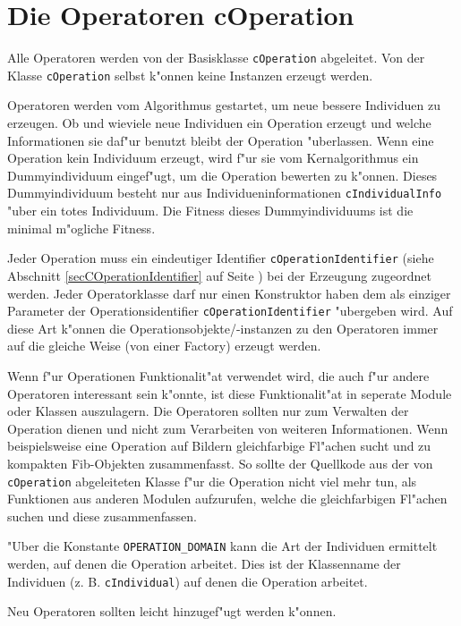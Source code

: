 \section{Die Operatoren cOperation}
\label{secOperations}

Alle Operatoren werden von der Basisklasse \verb|cOperation| abgeleitet. Von der Klasse \verb|cOperation| selbst k"onnen keine Instanzen erzeugt werden.

Operatoren werden vom Algorithmus gestartet, um neue bessere Individuen zu erzeugen. Ob und wieviele neue Individuen ein Operation erzeugt und welche Informationen sie daf"ur benutzt bleibt der Operation "uberlassen.
Wenn eine Operation kein Individuum erzeugt, wird f"ur sie vom Kernalgorithmus ein Dummyindividuum eingef"ugt, um die Operation bewerten zu k"onnen. Dieses Dummyindividuum besteht nur aus Individueninformationen \verb|cIndividualInfo| "uber ein totes Individuum. Die Fitness dieses Dummyindividuums ist die minimal m"ogliche Fitness.

Jeder Operation muss ein eindeutiger Identifier \verb|cOperationIdentifier| (siehe Abschnitt \ref{secCOperationIdentifier} auf Seite \pageref{secCOperationIdentifier}) bei der Erzeugung zugeordnet werden. Jeder Operatorklasse darf nur einen Konstruktor haben dem als einziger Parameter der Operationsidentifier \verb|cOperationIdentifier| "ubergeben wird. Auf diese Art k"onnen die Operationsobjekte/-instanzen zu den Operatoren immer auf die gleiche Weise (von einer Factory) erzeugt werden.

Wenn f"ur Operationen Funktionalit"at verwendet wird, die auch f"ur andere Operatoren interessant sein k"onnte, ist diese Funktionalit"at in seperate Module oder Klassen auszulagern. Die Operatoren sollten nur zum Verwalten der Operation dienen und nicht zum Verarbeiten von weiteren Informationen.
Wenn beispielsweise eine Operation auf Bildern gleichfarbige Fl"achen sucht und zu kompakten Fib-Objekten zusammenfasst. So sollte der Quellkode aus der von \verb|cOperation| abgeleiteten Klasse f"ur die Operation nicht viel mehr tun, als Funktionen aus anderen Modulen aufzurufen, welche die gleichfarbigen Fl"achen suchen und diese zusammenfassen.

"Uber die Konstante \verb|OPERATION_DOMAIN| kann die Art der Individuen ermittelt werden, auf denen die Operation arbeitet. Dies ist der Klassenname der Individuen (z. B. \verb|cIndividual|) auf denen die Operation arbeitet.

Neu Operatoren sollten leicht hinzugef"ugt werden k"onnen. %


